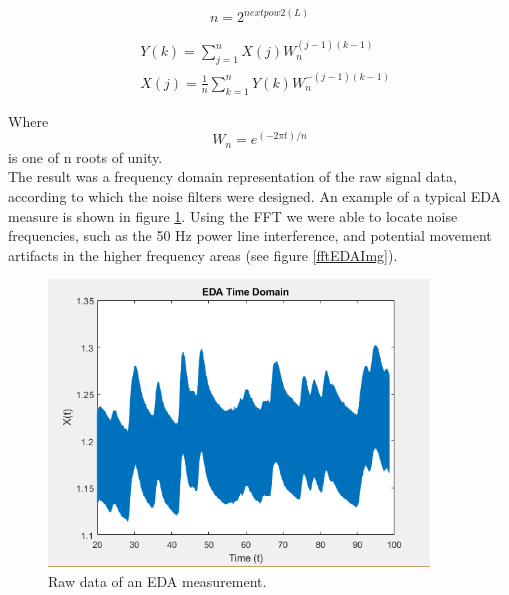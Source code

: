 \begin{equation}
n = 2^{nextpow2(L)}
\end{equation}

\begin{align}\label{fft1}
& Y(k) = \sum\limits_{j=1}^n X(j) W_{n}^{(j-1)(k-1)} \\
& X(j) = \frac{1}{n} \sum\limits_{k=1}^n Y(k) W_{n}^{-(j-1)(k-1)} 
\end{align} 

Where
\begin{equation}
W_{n} = e^{(-2\pi t)/n}
\end{equation}
is one of n roots of unity.\\

The result was a frequency domain representation of the raw signal data, according to which the noise filters were designed. An example of a typical EDA measure is shown in figure \ref{rawEDAImg}. Using the FFT we were able to locate noise frequencies, such as the 50 Hz power line interference, and potential movement artifacts in the higher frequency areas (see figure \ref{fftEDAImg}).

\begin{figure}[ht]
\centering
\includegraphics[width=0.9\textwidth]{images/rawEDA.png}
\caption{Raw data of an EDA measurement.}
\label{rawEDAImg}
\end{figure}

